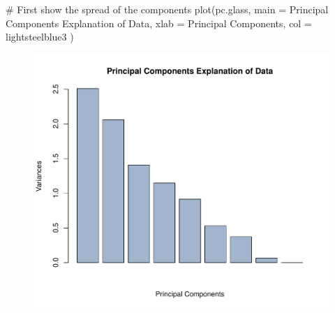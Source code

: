 \documentclass[
  letterpaper,
  DIV=11,
  numbers=noendperiod]{scrartcl}
\newenvironment{Shaded}{}{}
\newcommand{\AttributeTok}[1]{\textcolor[rgb]{0.84,0.23,0.29}{#1}}
\newcommand{\CommentTok}[1]{\textcolor[rgb]{0.42,0.45,0.49}{#1}}
\newcommand{\FunctionTok}[1]{\textcolor[rgb]{0.44,0.26,0.76}{#1}}
\newcommand{\NormalTok}[1]{\textcolor[rgb]{0.14,0.16,0.18}{#1}}
\newcommand{\StringTok}[1]{\textcolor[rgb]{0.01,0.18,0.38}{#1}}
\begin{document}
\begin{Shaded}
\begin{Highlighting}[]
\CommentTok{\# First show the spread of the components}
\FunctionTok{plot}\NormalTok{(pc.glass,}
     \AttributeTok{main =} \StringTok{\textquotesingle{}Principal Components Explanation of Data\textquotesingle{}}\NormalTok{,}
     \AttributeTok{xlab =} \StringTok{\textquotesingle{}Principal Components\textquotesingle{}}\NormalTok{,}
     \AttributeTok{col  =} \StringTok{\textquotesingle{}lightsteelblue3\textquotesingle{}}
\NormalTok{     )}
\end{Highlighting}
\end{Shaded}

\begin{figure}[H]

{\centering \includegraphics{Carpenter-HW3_files/figure-pdf/unnamed-chunk-18-1.pdf}

}

\end{figure}
\end{document}
